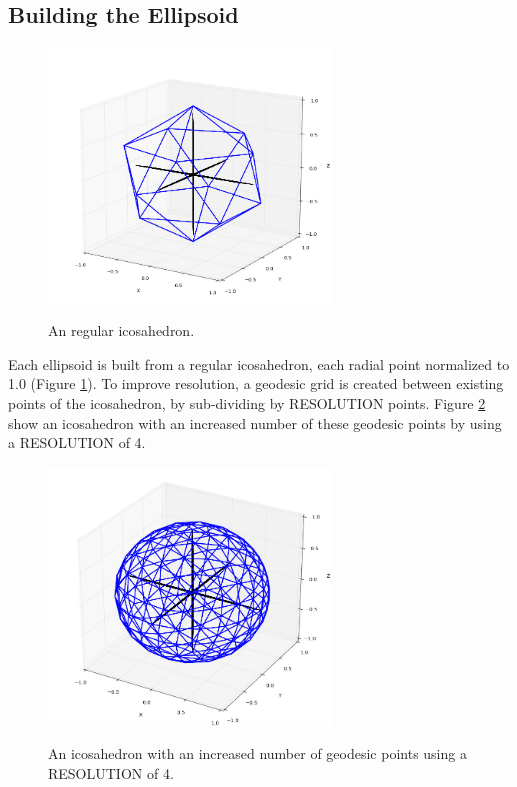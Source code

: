 \documentclass[11pt]{article}
\begin{document}
\subsection{Building the Ellipsoid}
\begin{figure}[h!]
  \caption{An regular icosahedron.}
  \centering
    \includegraphics[width=7.5cm]{icosahedron}
    \label{fig:icosahedron}
\end{figure}

Each ellipsoid is built from a regular icosahedron, each radial point normalized to 1.0 (Figure \ref{fig:icosahedron}). To improve resolution, a geodesic grid is created between existing points of the icosahedron, by sub-dividing by {\footnotesize RESOLUTION} points. Figure \ref{fig:icosahedron2_n4} show an icosahedron with an increased number of these geodesic points by  using a {\footnotesize RESOLUTION} of 4.
\begin{figure}[h!]
  \caption{An icosahedron with an increased number of geodesic points using a {\footnotesize RESOLUTION} of 4.}
  \centering
    \includegraphics[width=7.5cm]{icosahedron2_n4}
    \label{fig:icosahedron2_n4}
\end{figure}
\end{document}
